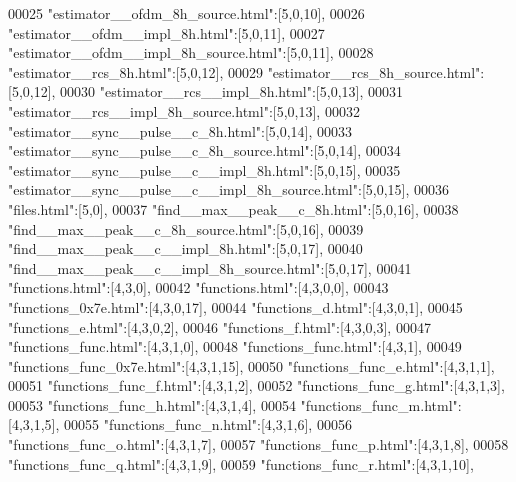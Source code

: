 \begin{DoxyCode}
00025 \textcolor{stringliteral}{"estimator\_\_ofdm\_8h\_source.html"}:[5,0,10],
00026 \textcolor{stringliteral}{"estimator\_\_ofdm\_\_impl\_8h.html"}:[5,0,11],
00027 \textcolor{stringliteral}{"estimator\_\_ofdm\_\_impl\_8h\_source.html"}:[5,0,11],
00028 \textcolor{stringliteral}{"estimator\_\_rcs\_8h.html"}:[5,0,12],
00029 \textcolor{stringliteral}{"estimator\_\_rcs\_8h\_source.html"}:[5,0,12],
00030 \textcolor{stringliteral}{"estimator\_\_rcs\_\_impl\_8h.html"}:[5,0,13],
00031 \textcolor{stringliteral}{"estimator\_\_rcs\_\_impl\_8h\_source.html"}:[5,0,13],
00032 \textcolor{stringliteral}{"estimator\_\_sync\_\_pulse\_\_c\_8h.html"}:[5,0,14],
00033 \textcolor{stringliteral}{"estimator\_\_sync\_\_pulse\_\_c\_8h\_source.html"}:[5,0,14],
00034 \textcolor{stringliteral}{"estimator\_\_sync\_\_pulse\_\_c\_\_impl\_8h.html"}:[5,0,15],
00035 \textcolor{stringliteral}{"estimator\_\_sync\_\_pulse\_\_c\_\_impl\_8h\_source.html"}:[5,0,15],
00036 \textcolor{stringliteral}{"files.html"}:[5,0],
00037 \textcolor{stringliteral}{"find\_\_max\_\_peak\_\_c\_8h.html"}:[5,0,16],
00038 \textcolor{stringliteral}{"find\_\_max\_\_peak\_\_c\_8h\_source.html"}:[5,0,16],
00039 \textcolor{stringliteral}{"find\_\_max\_\_peak\_\_c\_\_impl\_8h.html"}:[5,0,17],
00040 \textcolor{stringliteral}{"find\_\_max\_\_peak\_\_c\_\_impl\_8h\_source.html"}:[5,0,17],
00041 \textcolor{stringliteral}{"functions.html"}:[4,3,0],
00042 \textcolor{stringliteral}{"functions.html"}:[4,3,0,0],
00043 \textcolor{stringliteral}{"functions\_0x7e.html"}:[4,3,0,17],
00044 \textcolor{stringliteral}{"functions\_d.html"}:[4,3,0,1],
00045 \textcolor{stringliteral}{"functions\_e.html"}:[4,3,0,2],
00046 \textcolor{stringliteral}{"functions\_f.html"}:[4,3,0,3],
00047 \textcolor{stringliteral}{"functions\_func.html"}:[4,3,1,0],
00048 \textcolor{stringliteral}{"functions\_func.html"}:[4,3,1],
00049 \textcolor{stringliteral}{"functions\_func\_0x7e.html"}:[4,3,1,15],
00050 \textcolor{stringliteral}{"functions\_func\_e.html"}:[4,3,1,1],
00051 \textcolor{stringliteral}{"functions\_func\_f.html"}:[4,3,1,2],
00052 \textcolor{stringliteral}{"functions\_func\_g.html"}:[4,3,1,3],
00053 \textcolor{stringliteral}{"functions\_func\_h.html"}:[4,3,1,4],
00054 \textcolor{stringliteral}{"functions\_func\_m.html"}:[4,3,1,5],
00055 \textcolor{stringliteral}{"functions\_func\_n.html"}:[4,3,1,6],
00056 \textcolor{stringliteral}{"functions\_func\_o.html"}:[4,3,1,7],
00057 \textcolor{stringliteral}{"functions\_func\_p.html"}:[4,3,1,8],
00058 \textcolor{stringliteral}{"functions\_func\_q.html"}:[4,3,1,9],
00059 \textcolor{stringliteral}{"functions\_func\_r.html"}:[4,3,1,10],

\end{DoxyCode}
